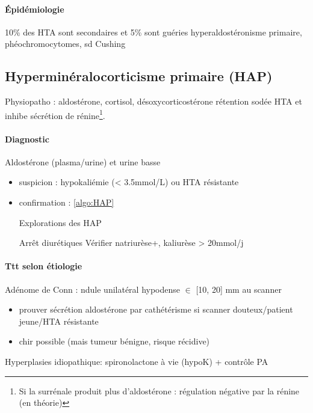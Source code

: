 \documentclass{book}
\begin{document}
\paragraph{Épidémiologie}
\label{sec:org18de4e8}
10\% des HTA sont secondaires et 5\% sont guéries \thus hyperaldostéronisme
primaire, phéochromocytomes, sd Cushing

\subsection{Hyperminéralocorticisme primaire (HAP)}
\label{sec:org4bbba6b}
Physiopatho : aldostérone, cortisol, désoxycorticostérone \thus rétention sodée
\thus HTA et inhibe sécrétion de rénine\footnote{Si la surrénale produit plus d'aldostérone : régulation négative par la rénine (en théorie)}.

\paragraph{Diagnostic}
\label{sec:org45b9157}
Aldostérone \inc (plasma/urine) et urine basse
\begin{itemize}
\item suspicion : hypokaliémie (< 3.5mmol/L) ou HTA résistante
\item confirmation : \ref{algo:HAP}  
\begin{algorithm}
  \caption{Explorations des HAP}
  \label{algo:HAP}
  Arrêt diurétiques\;
  Vérifier natriurèse+, kaliurèse > 20mmol/j\;
\end{algorithm}
\end{itemize}

\paragraph{Ttt selon étiologie}
\label{sec:org82bc052}
Adénome de Conn : ndule unilatéral hypodense \(\in\) [10, 20] mm au scanner
\begin{itemize}
\item prouver sécrétion aldostérone par cathétérisme si scanner douteux/patient jeune/HTA résistante
\item chir possible (mais tumeur bénigne, risque récidive)
\end{itemize}
Hyperplasies idiopathique: spironolactone à vie (hypoK) + contrôle PA
\end{document}
